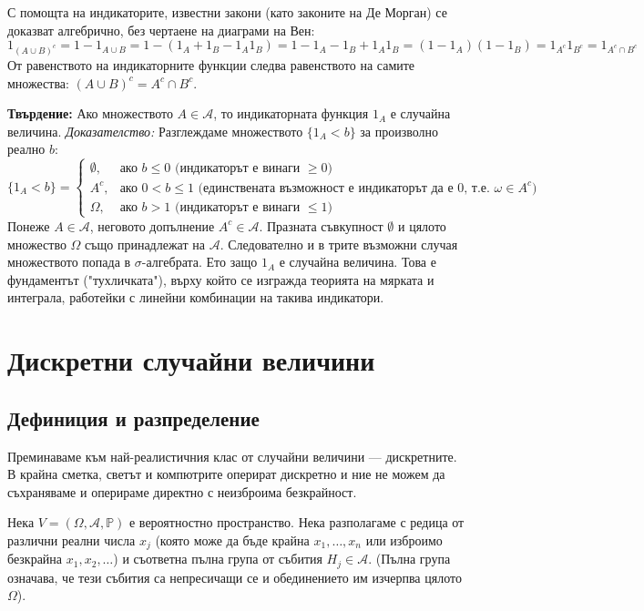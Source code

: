 \documentclass{article}
\begin{document}
С помощта на индикаторите, известни закони (като законите на Де Морган) се доказват алгебрично, без чертаене на диаграми на Вен:
\[ 1_{(A \cup B)^c} = 1 - 1_{A \cup B} = 1 - (1_A + 1_B - 1_A 1_B) = 1 - 1_A - 1_B + 1_A 1_B = (1 - 1_A)(1 - 1_B) = 1_{A^c} 1_{B^c} = 1_{A^c \cap B^c} \]
От равенството на индикаторните функции следва равенството на самите множества: $(A \cup B)^c = A^c \cap B^c$.

\textbf{Твърдение:} Ако множеството $A \in \mathcal{A}$, то индикаторната функция $1_A$ е случайна величина.
\textit{Доказателство:} Разглеждаме множеството $\{ 1_A < b \}$ за произволно реално $b$:
\[
\{ 1_A < b \} = 
\begin{cases} 
\emptyset, & \text{ако } b \le 0 \text{ (индикаторът е винаги }\ge 0\text{)}\\
A^c, & \text{ако } 0 < b \le 1 \text{ (единствената възможност е индикаторът да е 0, т.е. } \omega \in A^c\text{)}\\
\Omega, & \text{ако } b > 1 \text{ (индикаторът е винаги }\le 1\text{)}
\end{cases}
\]
Понеже $A \in \mathcal{A}$, неговото допълнение $A^c \in \mathcal{A}$. Празната съвкупност $\emptyset$ и цялото множество $\Omega$ също принадлежат на $\mathcal{A}$. Следователно и в трите възможни случая множеството попада в $\sigma$-алгебрата. Ето защо $1_A$ е случайна величина. Това е фундаментът ("тухличката"), върху който се изгражда теорията на мярката и интеграла, работейки с линейни комбинации на такива индикатори.

\section{Дискретни случайни величини}

\subsection{Дефиниция и разпределение}
Преминаваме към най-реалистичния клас от случайни величини — дискретните. В крайна сметка, светът и компютрите оперират дискретно и ние не можем да съхраняваме и оперираме директно с неизброима безкрайност.

Нека $V = (\Omega, \mathcal{A}, \mathbb{P})$ е вероятностно пространство. Нека разполагаме с редица от различни реални числа $x_j$ (която може да бъде крайна $x_1, \dots, x_n$ или изброимо безкрайна $x_1, x_2, \dots$) и съответна пълна група от събития $H_j \in \mathcal{A}$. (Пълна група означава, че тези събития са непресичащи се и обединението им изчерпва цялото $\Omega$).
\end{document}
